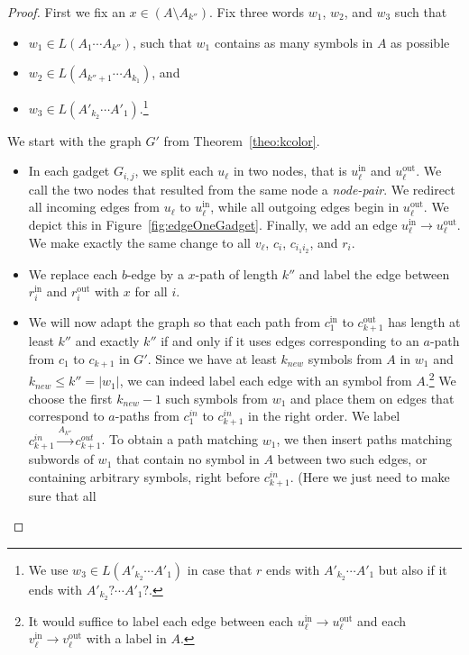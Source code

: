 \documentclass[a4paper,english]{lipics-v2016}
\theoremstyle{plain}
\begin{document}
\begin{proof}
First we fix an $x \in (A \setminus A_{k''})$. Fix three words
  $w_1$, $w_2$, and $w_3$ such that
  \begin{itemize}
  \item $w_1 \in L(A_1 \cdots A_{k''})$, such that $w_1$ contains as many symbols in $A$ as possible
  \item $w_2 \in L(A_{k''+1} \cdots
    A_{k_1})$, and
  \item $w_3 \in L(A'_{k_2} \cdots A'_1)$.\footnote{We use $w_3 \in
      L(A'_{k_2} \cdots A'_1)$ in case that $r$ ends with $A'_{k_2}
      \cdots A'_1$ but also if it ends with $A'_{k_2}? \cdots A'_1?$.}
  \end{itemize}
We start with the graph $G'$ from Theorem~\ref{theo:kcolor}.
\begin{itemize}
\item In each gadget $G_{i,j}$, we split each $u_\ell$ in two nodes, that is $u_\ell^\text{in}$ and $u_\ell^\text{out}$. We call the two nodes that resulted from the same node a \emph{node-pair}. We redirect all incoming edges from $u_\ell$ to $u_\ell^\text{in}$, while all outgoing edges begin in $u_\ell^\text{out}$. We depict this in Figure~\ref{fig:edgeOneGadget}.
 Finally, we add an edge $u_\ell^\text{in} \to u_\ell^\text{out}$. We make exactly the same change to all $v_\ell$, $c_i$, $c_{i_1i_2}$, and $r_i$. 
\item We replace each $b$-edge by a $x$-path of length $k''$ and label the edge between $r_i^\text{in}$ and $r_i^\text{out}$ with $x$ for all $i$.
\item We will now adapt the graph so that each path from $c_1^\text{in}$ to $c_{k+1}^\text{out}$ has length at least $k''$ and exactly $k''$ if and only if it uses edges corresponding to an $a$-path from $c_1$ to $c_{k+1}$ in $G'$. Since we have at least $k_{new}$ symbols from $A$ in $w_1$ and $k_{new}\leq k'' = |w_1|$, we can indeed label each edge with an symbol from $A$.\footnote{It would suffice to label each edge between each $u_\ell^\text{in}\to u_\ell^\text{out}$ and each $v_\ell^\text{in}\to v_\ell^\text{out}$ with a label in $A$.} 
We choose the first $k_{new}-1$ such symbols from $w_1$ and place them
on edges that correspond to $a$-paths from $c_1^{in}$ to
$c_{k+1}^{in}$ in the right order. We label $c_{k+1}^{in}
\stackrel{A_{k''}}{\to} c_{k+1}^{out}$. To obtain a path matching
$w_1$, we then insert paths matching subwords of $w_1$ that contain no
symbol in $A$ between two such edges, or containing arbitrary symbols,
right before $c_{k+1}^{in}$. (Here we just need to make sure that all

\end{itemize}
\end{proof}
\end{document}
